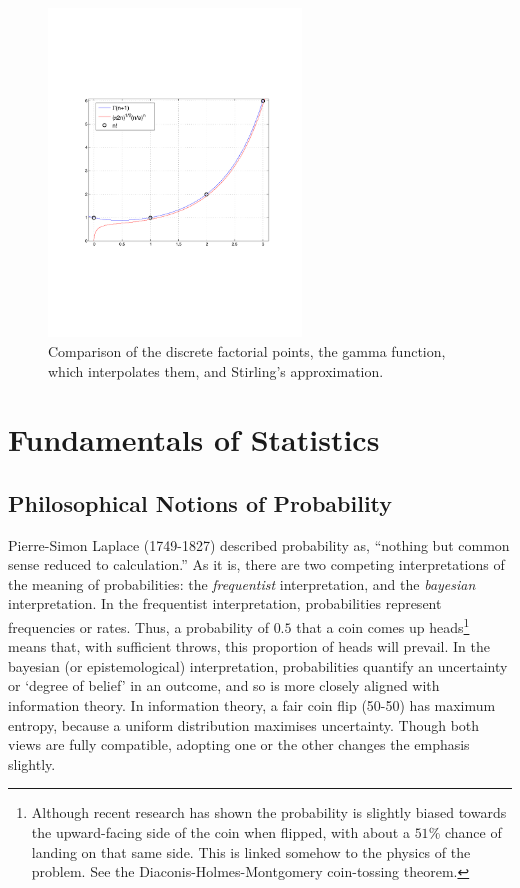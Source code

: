 \documentclass[11pt]{amsart}
\begin{document}
\begin{figure}[!ht]
\centering
\includegraphics[width=0.6\textwidth]{Figures/factorial.pdf}
\caption{Comparison of the discrete factorial points, the gamma function, which interpolates them, and Stirling's approximation.\cite{factorial}}
\label{fig:factorial}
\end{figure}

\section{Fundamentals of Statistics}
\subsection{Philosophical Notions of Probability}

Pierre-Simon Laplace (1749-1827) described probability as, ``nothing but common sense reduced to calculation.'' As it is, there are two competing interpretations of the meaning of probabilities: the \emph{frequentist} interpretation, and the \emph{bayesian} interpretation. In the frequentist interpretation, probabilities represent frequencies or rates. Thus, a probability of $0.5$ that a coin comes up heads\footnote{Although recent research has shown the probability is slightly biased towards the upward-facing side of the coin when flipped, with about a $51\%$ chance of landing on that same side. This is linked somehow to the physics of the problem. See the Diaconis-Holmes-Montgomery coin-tossing theorem.} means that, with sufficient throws, this proportion of heads will prevail. In the bayesian (or epistemological) interpretation, probabilities quantify an uncertainty or `degree of belief' in an outcome, and so is more closely aligned with information theory. In information theory, a fair coin flip (50-50) has maximum entropy, because a uniform distribution maximises uncertainty. Though both views are fully compatible, adopting one or the other changes the emphasis slightly.
\end{document}
